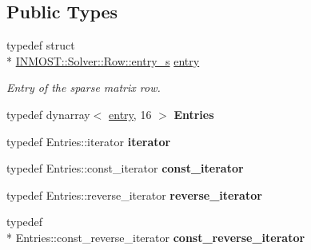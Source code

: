 \subsection*{Public Types}
\begin{DoxyCompactItemize}
\item 
\hypertarget{classINMOST_1_1Solver_1_1Row_a83f9b826189f21abd7ad395608901825}{typedef struct \\*
\hyperlink{structINMOST_1_1Solver_1_1Row_1_1entry__s}{I\-N\-M\-O\-S\-T\-::\-Solver\-::\-Row\-::entry\-\_\-s} \hyperlink{classINMOST_1_1Solver_1_1Row_a83f9b826189f21abd7ad395608901825}{entry}}\label{classINMOST_1_1Solver_1_1Row_a83f9b826189f21abd7ad395608901825}

\begin{DoxyCompactList}\small\item\em Entry of the sparse matrix row. \end{DoxyCompactList}\item 
\hypertarget{classINMOST_1_1Solver_1_1Row_afbcd3de717631f8d5d2dd53ebaf3855b}{typedef dynarray$<$ \hyperlink{classINMOST_1_1Solver_1_1Row_a83f9b826189f21abd7ad395608901825}{entry}, 16 $>$ {\bfseries Entries}}\label{classINMOST_1_1Solver_1_1Row_afbcd3de717631f8d5d2dd53ebaf3855b}

\item 
\hypertarget{classINMOST_1_1Solver_1_1Row_ab8acd9e8e471bcc8e0ef5acf4974e3e3}{typedef Entries\-::iterator {\bfseries iterator}}\label{classINMOST_1_1Solver_1_1Row_ab8acd9e8e471bcc8e0ef5acf4974e3e3}

\item 
\hypertarget{classINMOST_1_1Solver_1_1Row_a20fda02b31081d59482d9bbe1d2219be}{typedef Entries\-::const\-\_\-iterator {\bfseries const\-\_\-iterator}}\label{classINMOST_1_1Solver_1_1Row_a20fda02b31081d59482d9bbe1d2219be}

\item 
\hypertarget{classINMOST_1_1Solver_1_1Row_a5b9530cb6fce446eea45ce9128b8feef}{typedef Entries\-::reverse\-\_\-iterator {\bfseries reverse\-\_\-iterator}}\label{classINMOST_1_1Solver_1_1Row_a5b9530cb6fce446eea45ce9128b8feef}

\item 
\hypertarget{classINMOST_1_1Solver_1_1Row_a8917a1291254817a0ed93c9b62c53f58}{typedef \\*
Entries\-::const\-\_\-reverse\-\_\-iterator {\bfseries const\-\_\-reverse\-\_\-iterator}}\label{classINMOST_1_1Solver_1_1Row_a8917a1291254817a0ed93c9b62c53f58}

\end{DoxyCompactItemize}

